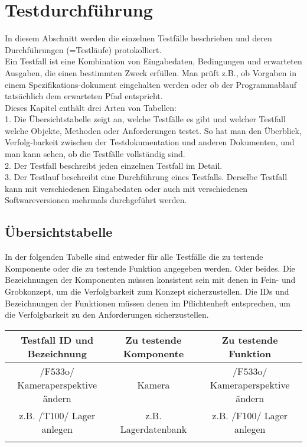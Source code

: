 
\chapter{Testdurchführung}

In diesem Abschnitt werden die einzelnen Testfälle beschrieben und deren
Durchführungen (=Testläufe) protokolliert.\\
Ein Testfall ist eine Kombination von Eingabedaten, Bedingungen und erwarteten
Ausgaben, die einen bestimmten Zweck erfüllen. Man prüft z.B., ob Vorgaben in
einem Spezifikations-dokument eingehalten werden oder ob der Programmablauf
tatsächlich dem erwarteten Pfad entspricht.\\
Dieses Kapitel enthält drei Arten von Tabellen:\\
1.  Die Übersichtstabelle zeigt an, welche Testfälle es gibt und welcher
Testfall welche Objekte, Methoden oder Anforderungen testet. So hat man den
Überblick, Verfolg-barkeit zwischen der Testdokumentation und anderen
Dokumenten, und man kann sehen, ob die Testfälle vollständig sind.\\
2.  Der Testfall beschreibt jeden einzelnen Testfall im Detail.\\
3.  Der Testlauf beschreibt eine Durchführung eines Testfalls. Derselbe
Testfall kann mit verschiedenen Eingabedaten oder auch mit verschiedenen
Softwareversionen mehrmals durchgeführt werden.\\

\section{Übersichtstabelle}
  In der folgenden Tabelle sind entweder für alle Testfälle die zu testende
  Komponente oder die zu testende Funktion angegeben werden. Oder beides. Die
  Bezeichnungen der Komponenten müssen konsistent sein mit denen in Fein- und
  Grobkonzept, um die Verfolgbarkeit zum Konzept sicherzustellen. Die IDs und
  Bezeichnungen der Funktionen müssen denen im Pflichtenheft entsprechen, um
  die Verfolgbarkeit zu den Anforderungen sicherzustellen. \\
\begin{tabular}{|c|c|c|}
\hline
\textbf{Testfall ID und Bezeichnung} &  \textbf {Zu testende Komponente} &
\textbf {Zu testende Funktion}\\
\hline
/F533o/ Kameraperspektive ändern &  Kamera  & /F533o/ Kameraperspektive ändern \\
\hline
z.B. /T100/ Lager anlegen &  z.B. Lagerdatenbank  & z.B. /F100/ Lager anlegen \\
\hline
&&
\end{tabular}


